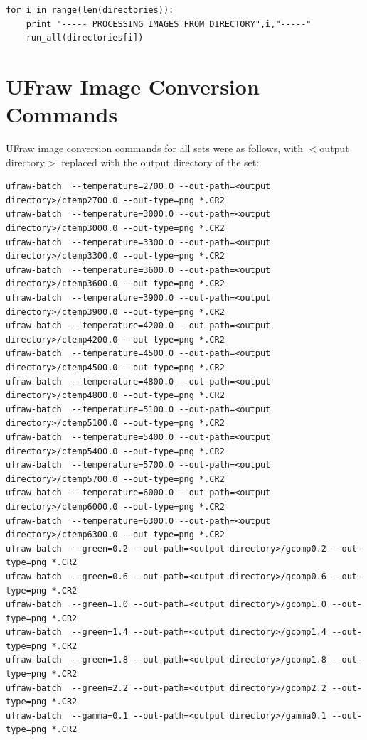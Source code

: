 \documentclass{report}
\begin{document}
\begin{lstlisting}[style=Python2]
for i in range(len(directories)):
	print "----- PROCESSING IMAGES FROM DIRECTORY",i,"-----"
	run_all(directories[i])

\end{lstlisting}
\normalsize


\section{UFraw Image Conversion Commands} \label{ufrawcommands}

UFraw image conversion commands for all sets were as follows, with $<$output directory$>$ replaced with the output directory of the set:

\scriptsize
\begin{lstlisting}
ufraw-batch  --temperature=2700.0 --out-path=<output directory>/ctemp2700.0 --out-type=png *.CR2
ufraw-batch  --temperature=3000.0 --out-path=<output directory>/ctemp3000.0 --out-type=png *.CR2
ufraw-batch  --temperature=3300.0 --out-path=<output directory>/ctemp3300.0 --out-type=png *.CR2
ufraw-batch  --temperature=3600.0 --out-path=<output directory>/ctemp3600.0 --out-type=png *.CR2
ufraw-batch  --temperature=3900.0 --out-path=<output directory>/ctemp3900.0 --out-type=png *.CR2
ufraw-batch  --temperature=4200.0 --out-path=<output directory>/ctemp4200.0 --out-type=png *.CR2
ufraw-batch  --temperature=4500.0 --out-path=<output directory>/ctemp4500.0 --out-type=png *.CR2
ufraw-batch  --temperature=4800.0 --out-path=<output directory>/ctemp4800.0 --out-type=png *.CR2
ufraw-batch  --temperature=5100.0 --out-path=<output directory>/ctemp5100.0 --out-type=png *.CR2
ufraw-batch  --temperature=5400.0 --out-path=<output directory>/ctemp5400.0 --out-type=png *.CR2
ufraw-batch  --temperature=5700.0 --out-path=<output directory>/ctemp5700.0 --out-type=png *.CR2
ufraw-batch  --temperature=6000.0 --out-path=<output directory>/ctemp6000.0 --out-type=png *.CR2
ufraw-batch  --temperature=6300.0 --out-path=<output directory>/ctemp6300.0 --out-type=png *.CR2
ufraw-batch  --green=0.2 --out-path=<output directory>/gcomp0.2 --out-type=png *.CR2
ufraw-batch  --green=0.6 --out-path=<output directory>/gcomp0.6 --out-type=png *.CR2
ufraw-batch  --green=1.0 --out-path=<output directory>/gcomp1.0 --out-type=png *.CR2
ufraw-batch  --green=1.4 --out-path=<output directory>/gcomp1.4 --out-type=png *.CR2
ufraw-batch  --green=1.8 --out-path=<output directory>/gcomp1.8 --out-type=png *.CR2
ufraw-batch  --green=2.2 --out-path=<output directory>/gcomp2.2 --out-type=png *.CR2
ufraw-batch  --gamma=0.1 --out-path=<output directory>/gamma0.1 --out-type=png *.CR2

\end{lstlisting}
\end{document}
